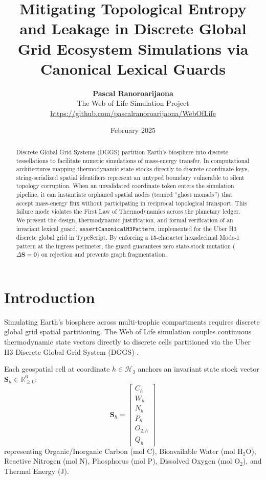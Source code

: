\documentclass[11pt,a4paper]{article}
\title{\textbf{Mitigating Topological Entropy and Leakage in Discrete Global Grid Ecosystem Simulations via Canonical Lexical Guards}}
\author{\textbf{Pascal Ranoroarijaona} \\
The Web of Life Simulation Project \\
\url{https://github.com/pascalranoroarijaona/WebOfLife}}
\date{February 2025}
\begin{document}
\maketitle

\begin{abstract}
Discrete Global Grid Systems (DGGS) partition Earth's biosphere into discrete tessellations to facilitate numeric simulations of mass-energy transfer. In computational architectures mapping thermodynamic state stocks directly to discrete coordinate keys, string-serialized spatial identifiers represent an untyped boundary vulnerable to silent topology corruption. When an unvalidated coordinate token enters the simulation pipeline, it can instantiate orphaned spatial nodes (termed ``ghost monads'') that accept mass-energy flux without participating in reciprocal topological transport. This failure mode violates the First Law of Thermodynamics across the planetary ledger. We present the design, thermodynamic justification, and formal verification of an invariant lexical guard, \texttt{assertCanonicalH3Pattern}, implemented for the Uber H3 discrete global grid in TypeScript. By enforcing a 15-character hexadecimal Mode-1 pattern at the ingress perimeter, the guard guarantees zero state-stock mutation ($\Delta \mathbf{S} = \mathbf{0}$) on rejection and prevents graph fragmentation.
\end{abstract}

\section{Introduction}

Simulating Earth's biosphere across multi-trophic compartments requires discrete global grid spatial partitioning. The Web of Life simulation couples continuous thermodynamic state vectors directly to discrete cells partitioned via the Uber H3 Discrete Global Grid System (DGGS) \cite{sahr2003geodesic}.

Each geospatial cell at coordinate $h \in \mathcal{H}_3$ anchors an invariant state stock vector $\mathbf{S}_h \in \mathbb{R}_{\ge 0}^6$:
\begin{equation}
\mathbf{S}_h = \begin{bmatrix} C_h \\ W_h \\ N_h \\ P_h \\ O_{2,h} \\ Q_h \end{bmatrix}
\end{equation}
representing Organic/Inorganic Carbon (mol C), Bioavailable Water (mol $\text{H}_2\text{O}$), Reactive Nitrogen (mol N), Phosphorus (mol P), Dissolved Oxygen (mol $\text{O}_2$), and Thermal Energy (J).
\end{document}
